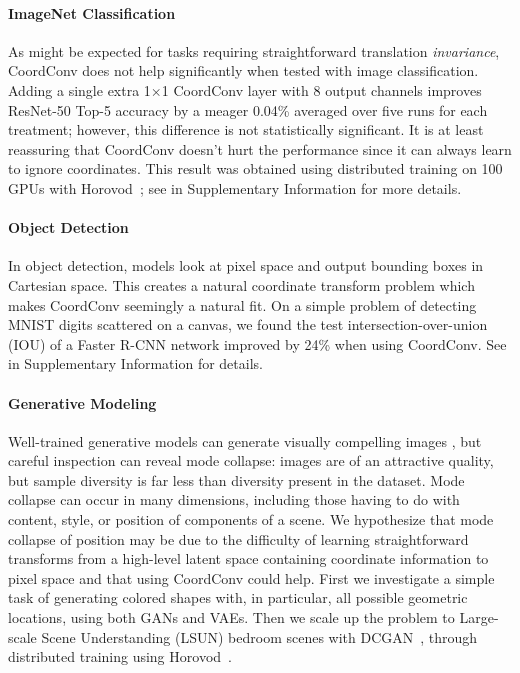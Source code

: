 \documentclass{article}
\begin{document}
\paragraph{ImageNet Classification}
As might be expected for tasks requiring straightforward translation \textit{invariance}, CoordConv does not help significantly when tested with image classification. Adding a single extra 1$\times$1 CoordConv layer with 8 output channels improves ResNet-50 \cite{he-2015-arXiv-deep-residual-learning} Top-5 accuracy by a meager 0.04\% averaged over five runs for each treatment; however, this difference is not statistically significant. It is at least reassuring that CoordConv doesn't hurt the performance since it can always learn to ignore coordinates.
This result was obtained using distributed training on 100 GPUs with Horovod~\cite{sergeev-2018-arXiv-horovod:-fast-and-easy}; see  in Supplementary Information for more details.


\vspace*{-.5em}

\paragraph{Object Detection} 
In object detection, models look at pixel space and output bounding boxes in Cartesian space. This creates a natural coordinate transform problem which makes CoordConv seemingly a natural fit. On a simple problem of detecting MNIST digits scattered on a canvas, we found the test intersection-over-union (IOU) of a Faster R-CNN network improved by 24\% when using CoordConv. See  in Supplementary Information for details.

\vspace*{-.5em}

\paragraph{Generative Modeling}

Well-trained generative models can generate visually compelling images \cite{nguyen-2016-arXiv-plug-amp-play-generative,karras-2018-ICLR-progressive-growing-of-gans,stack_gan}, but careful inspection can reveal mode collapse: images are of an attractive quality, but sample diversity is far less than diversity present in the dataset. Mode collapse can occur in many dimensions, including those having to do with content, style, or position of components of a scene. We hypothesize that mode collapse of position may be due to the difficulty of learning straightforward transforms from a high-level latent space containing coordinate information to pixel space and that using CoordConv could help. First we investigate a simple task of generating colored shapes with, in particular, all possible geometric locations, using both GANs and VAEs. Then we scale up the problem to Large-scale Scene Understanding (LSUN) \cite{lsun} bedroom scenes with DCGAN~\cite{dcgan}, through distributed training using Horovod~\cite{sergeev-2018-arXiv-horovod:-fast-and-easy}.
\end{document}

